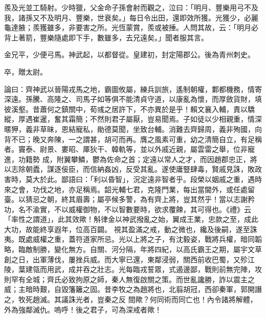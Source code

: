 \begin{pinyinscope}
 羨及光並工騎射。少時獵，父金命子孫會射而觀之，泣曰：「明月、豐樂用弓不及我，諸孫又不及明月、豐樂，世衰矣。」每日令出田，還即效所獲。光獲少，必麗龜達腋；羨獲雖多，非要害之所。光恆蒙賞，羨或被捶。人問其故，云：「明月必背上著箭，豐樂隨處即下手，數雖多，去兄遠矣。」聞者服其言。



 金兄平，少便弓馬。神武起，以都督從。皇建初，封定陽郡公。後為青州刺史。



 卒，贈太尉。



 論曰：齊神武以晉陽戎馬之地，霸圖攸屬，練兵訓旅，遙制朝權，鄴都機務，情寄深遠。孫騰、高隆之、司馬子如等俱不能清貞守道，以康亂為懷，而厚斂貨財，填彼溪壑。昔蕭何之鎮關中，荀彧之居許下，不亦異於是乎！賴文襄入輔，責以驕縱，厚遇崔暹，奮其霜簡；不然則君子屬厭，豈易聞焉。子如徒以少相親重，情深暱狎，義非草昧，恩結寵私，勛德莫聞，坐致台輔。消難去齊歸周，義非殉國，向背不已；晚又奔陳，一之謂甚，胡可而再。膺之風素可重，幼之清簡自立，有足稱者。竇泰、尉景、婁昭、厙狄干、韓軌等，並以外戚近親，屬雲雷之舉，位非寵進，功籍勢
 成，附翼攀鱗，鬱為佐命之首；定遠以常人之才，而因趙郡忠正，將以志除朝蠹，謀逐佞臣，而信納姦凶，反受其亂。遂使庸豎肆毒，賢戚見誅，敗政害時，莫大於此。鄙語曰：「利以昏智」，況定遠非智者乎。段榮以姻戚之重，遇時來之會，功伐之地，亦足稱焉。韶光輔七君，克隆門業，每出當閫外，或任處留臺。以猜忌之朝，終其眉壽；屬亭候多警，為有齊上將，豈其然乎！當以志謝矜功，名不渝實，不以威權御物，不以智數要時，欲求覆餗，其可得也。《禮》云「率性之謂道」，此其效歟！斛律金以神武撥亂之始，翼成王業，忠款之至，成此大功，故能終享遐年，位高百闢。
 視其盈滿之戒，動之微也，纔及後嗣，遂至誅夷。既處威權之重，蓋符道家所忌。光以上將之子，有沈毅姿，戰將兵權，暗同韜略，臨敵制勝，變化無方。自關、河分隔，年將四紀，以高氏霸王之期，屬宇文草創之日，出軍薄伐，屢挫兵威。而大寧已還，東鄰浸弱，關西前收巴蜀，又殄江陵，葉建瓴而用武，成并吞之壯志。光每臨戎誓眾，式遏邊鄙，戰則前無完陣，攻則罕有全城；齊氏必致拘原之師，秦人無復啟關之策。而世亂讒勝，詐以震主之威；主暗時艱，自毀籓籬之固。昔李牧之為趙將也，北翦胡冠，西卻秦軍，郭開譖之，牧死趙滅。其議誅光者，豈秦之反
 間歟？何同術而同亡也！內令諸將解體，外為強鄰滅仇。嗚呼！後之君子，可為深戒者歟！



\end{pinyinscope}